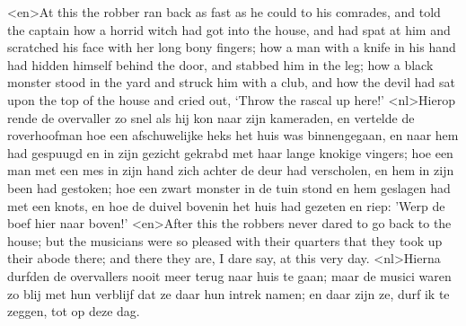 <en>At this the robber ran back as fast as he could to his comrades, and told the captain how a horrid witch had got into the house, and had spat at him and scratched his face with her long bony fingers; how a man with a knife in his hand had hidden himself behind the door, and stabbed him in the leg; how a black monster stood in the yard and struck him with a club, and how the devil had sat upon the top of the house and cried out, ‘Throw the rascal up here!’
<nl>Hierop rende de overvaller zo snel als hij kon naar zijn kameraden, en vertelde de roverhoofman hoe een afschuwelijke heks het huis was binnengegaan, en naar hem had gespuugd en in zijn gezicht gekrabd met haar lange knokige vingers; hoe een man met een mes in zijn hand zich achter de deur had verscholen, en hem in zijn been had gestoken; hoe een zwart monster in de tuin stond en hem geslagen had met een knots, en hoe de duivel bovenin het huis had gezeten en riep: 'Werp de boef hier naar boven!'
<en>After this the robbers never dared to go back to the house; but the musicians were so pleased with their quarters that they took up their abode there; and there they are, I dare say, at this very day.
<nl>Hierna durfden de overvallers nooit meer terug naar huis te gaan; maar de musici waren zo blij met hun  verblijf dat ze daar hun intrek namen; en daar zijn ze, durf ik te zeggen, tot op deze dag.
